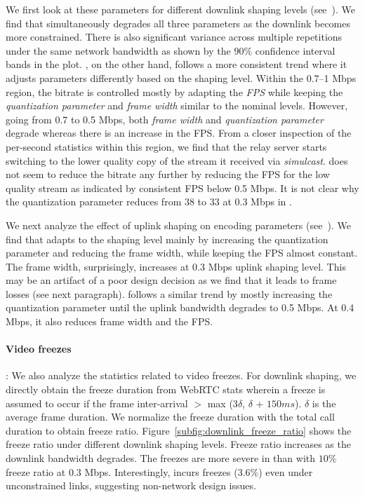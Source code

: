 We first look at these parameters for different downlink shaping levels
(see~).
We find that \teamsbrowser simultaneously degrades all three parameters as the
downlink becomes more constrained. There is also significant variance across
multiple repetitions under the same network bandwidth as shown by the $90\%$
confidence interval bands in the plot. \meet, on the other hand, follows a
more consistent trend where it adjusts parameters differently based on the
shaping level. Within the  0.7--1 Mbps region, the bitrate is controlled
mostly by adapting the \textit{FPS} while keeping the \textit{quantization
parameter} and \textit{frame width} similar to the nominal levels. However,
going from 0.7 to 0.5 Mbps, both \textit{frame width} and \textit{quantization
parameter} degrade whereas there is an increase in the FPS. From a closer
inspection of the per-second statistics within this region, we find that the
relay server starts switching to the lower quality copy of the stream it
received via \textit{simulcast}. \meet does not seem to reduce the bitrate any
further by reducing the FPS for the low quality stream as indicated by
consistent FPS below 0.5 Mbps. It is not clear why the quantization parameter
reduces from 38 to 33 at 0.3 Mbps in \meet. 

We next analyze the effect of uplink shaping on encoding parameters (see~). We find that \teams adapts to the shaping level mainly by increasing the quantization parameter and reducing the frame width, while keeping the FPS almost constant. The frame width, surprisingly, increases at 0.3 Mbps uplink shaping level. This may be an artifact of a poor design decision as we find that it leads to frame losses (see next paragraph). \meet follows a similar trend by mostly increasing the quantization parameter until the uplink bandwidth degrades to 0.5 Mbps. At 0.4 Mbps, it also reduces frame width and the FPS. 

\paragraph{Video freezes}: We also analyze the statistics related to video freezes. For downlink shaping, we directly obtain the freeze duration from WebRTC stats wherein a freeze is assumed to occur if the frame inter-arrival $>$ max (3$\delta$, $\delta$ + $150 ms$). $\delta$ is the average frame duration. We normalize the freeze duration with the total call duration to obtain freeze ratio.  Figure~\ref{subfig:downlink_freeze_ratio} shows the freeze ratio under different downlink shaping levels. Freeze ratio increases as the downlink bandwidth degrades. The freezes are more severe in \meet than \teamsbrowser with $10\%$ freeze ratio at 0.3 Mbps. Interestingly, \teamsbrowser incurs freezes ($3.6\%$) even under unconstrained links, suggesting non-network design issues. 

